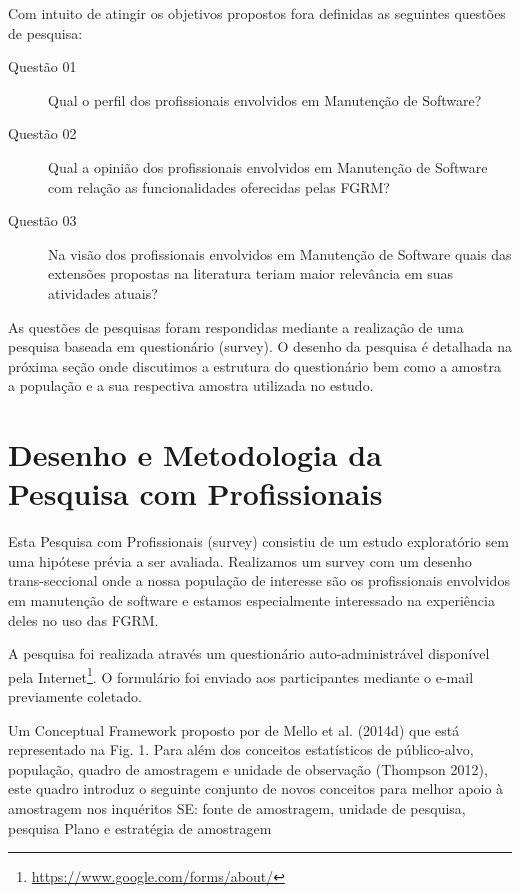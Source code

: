 Com intuito de atingir os objetivos propostos fora definidas as seguintes
questões de pesquisa:
\begin{description}
	\item[Questão 01] Qual o perfil dos profissionais envolvidos em Manutenção
		de Software?
	\item[Questão 02] Qual a opinião dos profissionais envolvidos em Manutenção
		de Software com relação as funcionalidades oferecidas pelas FGRM\@?
	\item [Questão 03] Na visão  dos profissionais envolvidos em Manutenção de Software quais das
		extensões propostas na literatura teriam maior relevância em suas atividades atuais?
\end{description}

As questões de pesquisas foram respondidas mediante a realização de uma pesquisa
baseada em questionário (survey). O desenho da pesquisa é detalhada na próxima
seção onde discutimos a estrutura do questionário bem como a amostra a população
e a sua respectiva amostra utilizada no estudo.

\section{Desenho e Metodologia da Pesquisa com Profissionais}
\label{sec:desenho_da_pesquisa_com_profissionais}

Esta Pesquisa com Profissionais (survey) consistiu de um estudo exploratório sem
uma hipótese prévia a ser avaliada. Realizamos um survey com um desenho
trans-seccional\cite{kitchenham2002principles} onde a nossa população de
interesse são os profissionais envolvidos em manutenção de software e estamos
especialmente interessado na experiência deles no uso das FGRM\@. 

A pesquisa foi realizada através um questionário auto-administrável disponível
pela Internet\footnote{\url{https://www.google.com/forms/about/}}. O formulário
foi enviado aos participantes mediante o e-mail previamente coletado.

Um Conceptual Framework proposto por de Mello et al. (2014d) que está
representado na Fig. 1. Para além dos conceitos estatísticos de público-alvo,
população, quadro de amostragem e unidade de observação (Thompson 2012), este
quadro introduz o seguinte conjunto de novos conceitos para melhor apoio à
amostragem nos inquéritos SE: fonte de amostragem, unidade de pesquisa, pesquisa
	Plano e estratégia de amostragem

